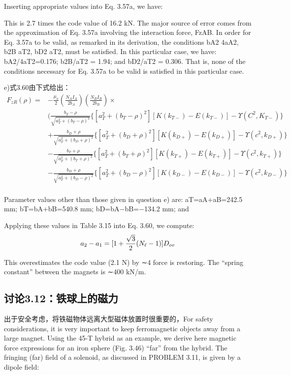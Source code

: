 Inserting appropriate values into Eq. 3.57a, we have:

This is 2.7 times the code value of 16.2 kN. The major source of error comes from
the approximation of Eq. 3.57a involving the interaction force, FzAB. In order
for Eq. 3.57a to be valid, as remarked in its derivation, the conditions bA2   4aA2,
b2B  aT2, bD2 aT2, must be satisfied. In this particular case, we have: bA2/4aT2=0.176;
b2B/aT2 = 1.94; and bD2/aT2 = 0.306. That is, none of the conditions necessary for
Eq. 3.57a to be valid is satisfied in this particular case.


e)式3.60由下式给出：
\begin{equation}
\begin{split}
F_{zR}(\rho)=&-\frac{\mu_{o}}{2}(\frac{N_{A}I_{A}}{2b_{A}})(\frac{N_{B}I_{B}}{2b_{B}})\times\\
&(\frac{b_{T}-\rho}{\sqrt{a_{T}^{2}+(b_{T}-\rho)^{2}}}\{[a_{T}^{2}+(b_{T}-\rho)^{2}][K(k_{T-})-E(k_{T-})]-\Upsilon(C^{2},K_{T-})\}\\
&+\frac{b_{D}+\rho}{\sqrt{a_{T}^{2}+(b_{D}+\rho)^{2}}}\{[a_{T}^{2}+(b_{D}+\rho)^{2}][K(k_{D+})-E(k_{D+})]-\Upsilon(c^{2},k_{D+})\}\\
&-\frac{b_{T}+\rho}{\sqrt{a_{T}^{2}+(b_{T}+\rho)^{2}}}\{[a_{T}^{2}+(b_{T}+\rho)^{2}][K(k_{T+})-E(k_{T+})]-\Upsilon(c^{2},k_{T+})\}\\
&-\frac{b_{D}+\rho}{\sqrt{a_{T}^{2}+(b_{D}-\rho)^{2}}}\{[a_{T}^{2}+(b_{D}-\rho)^{2}][K(k_{D-})-E(k_{D-})]-\Upsilon(c^{2},k_{D-})\}\\%
\end{split}
\end{equation}

Parameter values other than those given in question e) are: aT=aA+aB=242.5 mm;
bT=bA+bB=540.8 mm; bD=bA−bB=−134.2 mm; and


Applying these values in Table 3.15 into Eq. 3.60, we compute:
$$
a_{2}-a_{1}=[1+\frac{\sqrt{3}}{2}(N_{\ell}-1)]D_{ov}\\%
$$

This overestimates the code value (2.1 N) by ∼4%
force is restoring. The “spring constant” between the magnets is ∼400 kN/m.
\newpage


\subsection{讨论3.12：铁球上的磁力}
出于安全考虑，将铁磁物体远离大型磁体放置时很重要的，For safety considerations, it is very important to keep ferromagnetic objects away
from a large magnet. Using the 45-T hybrid as an example, we derive here magnetic
force expressions for an iron sphere (Fig. 3.46) “far” from the hybrid. The fringing
(far) field of a solenoid, as discussed in PROBLEM 3.11, is given by a dipole field:

